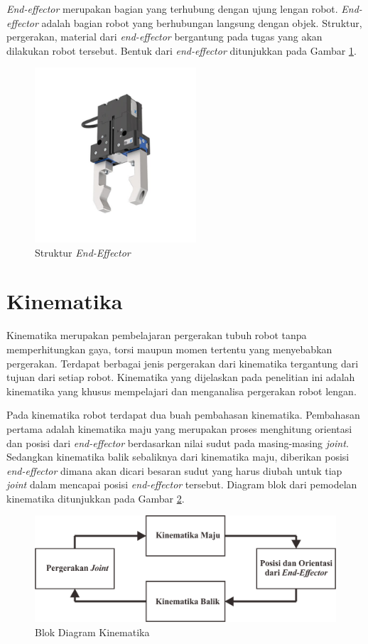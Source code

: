 \textit{End-effector} merupakan bagian yang terhubung dengan ujung lengan robot. \textit{End-effector} adalah bagian robot yang berhubungan langsung dengan objek. Struktur, pergerakan, material dari \textit{end-effector} bergantung pada tugas yang akan dilakukan robot tersebut. Bentuk dari \textit{end-effector} ditunjukkan pada Gambar \ref{pic.endeffector}.
\begin{figure}[H]
	\centering
	\includegraphics[width=6cm]{gambar/end_effector.jpg}
	\caption{Struktur \textit{End-Effector}\cite{Spong2006}}
	\label{pic.endeffector}
\end{figure}


\section{Kinematika}
Kinematika merupakan pembelajaran pergerakan tubuh robot tanpa memperhitungkan gaya, torsi maupun momen tertentu yang menyebabkan pergerakan. Terdapat berbagai jenis pergerakan dari kinematika tergantung dari tujuan dari setiap robot. Kinematika yang dijelaskan pada penelitian ini adalah kinematika yang khusus mempelajari dan menganalisa pergerakan robot lengan.  

Pada kinematika robot terdapat dua buah pembahasan kinematika. Pembahasan pertama adalah kinematika maju yang merupakan proses menghitung orientasi dan posisi dari\textit{ end-effector} berdasarkan nilai sudut pada masing-masing \textit{joint}.  Sedangkan kinematika balik sebaliknya dari kinematika maju, diberikan posisi \textit{end-effector} dimana akan dicari besaran sudut yang harus diubah untuk tiap \textit{joint} dalam mencapai posisi \textit{end-effector} tersebut\cite{beni}. Diagram blok dari pemodelan kinematika ditunjukkan pada Gambar \ref{pic.diagram.kinematika}. 
\begin{figure}[H]
	\centering
	\includegraphics[width=12cm]{gambar/kinematika_diagram.png}
	\caption{Blok Diagram Kinematika}
	\label{pic.diagram.kinematika}
\end{figure}

